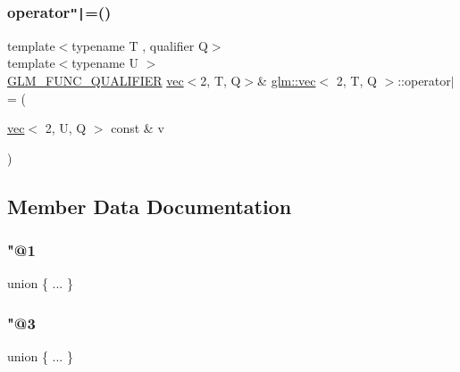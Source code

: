 \mbox{\label{structglm_1_1vec_3_012_00_01_t_00_01_q_01_4_a7c1e10ca06c86243f4ad6ceb094e7bdc}} 
\subsubsection{\texorpdfstring{operator\texttt{"|}=()}{operator|=()}\hspace{0.1cm}{\footnotesize\ttfamily [6/6]}}
{\footnotesize\ttfamily template$<$typename T , qualifier Q$>$ \\
template$<$typename U $>$ \\
\mbox{\hyperlink{setup_8hpp_a33fdea6f91c5f834105f7415e2a64407}{G\+L\+M\+\_\+\+F\+U\+N\+C\+\_\+\+Q\+U\+A\+L\+I\+F\+I\+ER}} \mbox{\hyperlink{structglm_1_1vec}{vec}}$<$2, T, Q$>$\& \mbox{\hyperlink{structglm_1_1vec}{glm\+::vec}}$<$ 2, T, Q $>$\+::operator$\vert$= (\begin{DoxyParamCaption}\item[{\mbox{\hyperlink{structglm_1_1vec}{vec}}$<$ 2, U, Q $>$ const \&}]{v }\end{DoxyParamCaption})}



\subsection{Member Data Documentation}
\mbox{\label{structglm_1_1vec_3_012_00_01_t_00_01_q_01_4_ab7e11768a87dbff4d5ac34875abe8c05}} 
\subsubsection{\texorpdfstring{"@1}{@1}}
{\footnotesize\ttfamily union \{ ... \} }

\mbox{\label{structglm_1_1vec_3_012_00_01_t_00_01_q_01_4_abe7f1c83f32575287a9bba2c2dfae5fb}} 
\subsubsection{\texorpdfstring{"@3}{@3}}
{\footnotesize\ttfamily union \{ ... \} }

